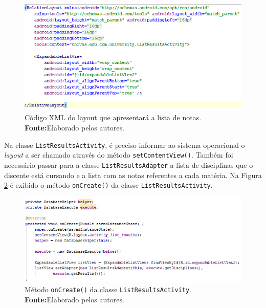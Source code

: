 		\begin{figure}[h!] 
			\centerline{\includegraphics[scale=0.7]{./imagens/2_q_metodologico/4_procedimentos_resultados/42_aplicativo/app11.png}}
			\caption[Código XML do layout que apresentará a lista de notas]{Código XML
			do layout que apresentará a lista de notas.
			\textbf{Fonte:}Elaborado pelos autores.}
			\label{fig:app11}
		\end{figure}
	
	\pagebreak
	
	\par Na classe \texttt{ListResultsActivity}, é preciso informar ao sistema
operacional o \textit{layout} a ser chamado através do método
\texttt{setContentView()}. Também foi necessário passar para a classe
\texttt{ListResultsAdapter} a lista de disciplinas que o discente está cursando
e a lista com as notas referentes a cada matéria. Na Figura \ref{fig:app12} é exibido o
método \texttt{onCreate()} da classe \texttt{ListResultsActivity}.


		\begin{figure}[h!] 
			\centerline{\includegraphics[scale=0.7]{./imagens/2_q_metodologico/4_procedimentos_resultados/42_aplicativo/app12.png}}
			\caption[Método onCreate() da classe ListResultsActivity]{Método \texttt{onCreate()} da classe
			\texttt{ListResultsActivity}.
			\textbf{Fonte:}Elaborado pelos autores.}
			\label{fig:app12}
		\end{figure}
	
